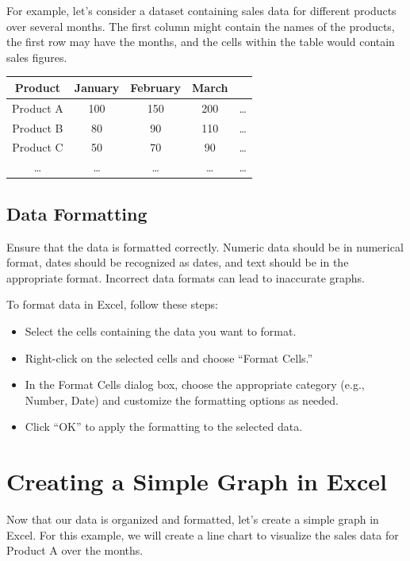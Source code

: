 \documentclass[
]{book}
\providecommand{\tightlist}{%
  \setlength{\itemsep}{0pt}\setlength{\parskip}{0pt}}
\begin{document}
For example, let's consider a dataset containing sales data for different products over several months. The first column might contain the names of the products, the first row may have the months, and the cells within the table would contain sales figures.

\begin{longtable}[]{@{}ccccc@{}}
\toprule()
Product & January & February & March & \\
\midrule()
\endhead
Product A & 100 & 150 & 200 & \ldots{} \\
Product B & 80 & 90 & 110 & \ldots{} \\
Product C & 50 & 70 & 90 & \ldots{} \\
\ldots{} & \ldots{} & \ldots{} & \ldots{} & \ldots{} \\
\bottomrule()
\end{longtable}

\hypertarget{data-formatting}{%
\subsection{Data Formatting}\label{data-formatting}}

Ensure that the data is formatted correctly. Numeric data should be in numerical format, dates should be recognized as dates, and text should be in the appropriate format. Incorrect data formats can lead to inaccurate graphs.

To format data in Excel, follow these steps:

\begin{itemize}
\tightlist
\item
  Select the cells containing the data you want to format.
\item
  Right-click on the selected cells and choose ``Format Cells.''
\item
  In the Format Cells dialog box, choose the appropriate category (e.g., Number, Date) and customize the formatting options as needed.
\item
  Click ``OK'' to apply the formatting to the selected data.
\end{itemize}

\hypertarget{creating-a-simple-graph-in-excel}{%
\section{Creating a Simple Graph in Excel}\label{creating-a-simple-graph-in-excel}}

Now that our data is organized and formatted, let's create a simple graph in Excel. For this example, we will create a line chart to visualize the sales data for Product A over the months.
\end{document}
